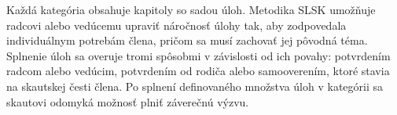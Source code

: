 




Každá kategória obsahuje kapitoly so sadou úloh. Metodika SLSK umožňuje radcovi alebo vedúcemu upraviť náročnosť úlohy tak, aby zodpovedala individuálnym potrebám člena, pričom sa musí zachovať jej pôvodná téma. Splnenie úloh sa overuje tromi spôsobmi v závislosti od ich povahy: potvrdením radcom alebo vedúcim, potvrdením od rodiča alebo samooverením, ktoré stavia na skautskej česti člena. Po splnení definovaného množstva úloh v kategórii sa skautovi odomyká možnosť plniť záverečnú výzvu.\cite{prvy_skaut,nezname_cesty,posledny_vrchol}





